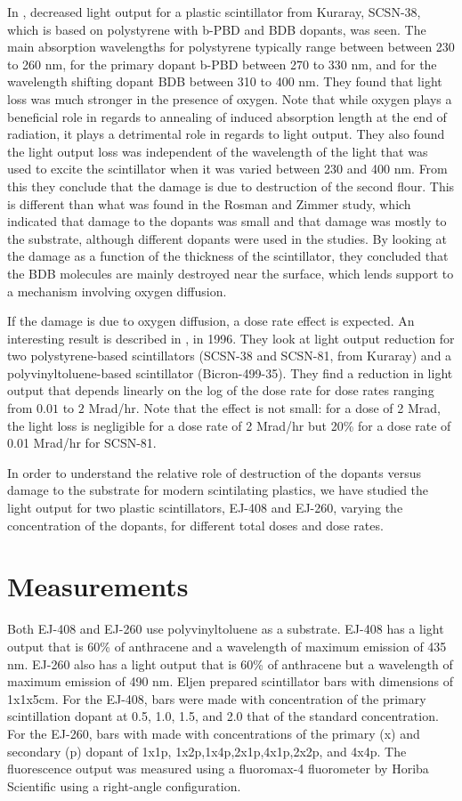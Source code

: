 \documentclass[review]{elsarticle}
\begin{document}
In \cite{Wick1991472}, decreased light
output for a plastic scintillator from Kuraray, SCSN-38, which
is based on polystyrene with b-PBD and BDB dopants, was seen.
The main absorption wavelengths for polystyrene typically range between
between 230 to 260 nm, for the primary dopant b-PBD between 270 to 330 nm,
and for the wavelength shifting dopant BDB between 310 to 400 nm.
They found that light loss was much stronger in the presence of oxygen.
Note that while oxygen plays a beneficial role in regards
to annealing of induced absorption length at the end of radiation, 
it plays a detrimental role in 
regards to light output.  
They also found the light output loss
was independent of the wavelength of the light
that was used to excite the scintillator when it
was varied between 230 and 400 nm.
From this they conclude that the damage is due to destruction
of the second flour.  This is different than what was found in
the Rosman and Zimmer study, which indicated that damage to the dopants was
small and that damage was mostly to the substrate,
although different dopants were used in the studies.
By looking at the damage as a function of the thickness of the scintillator,
they concluded that the BDB molecules are mainly destroyed
near the surface, which lends support to a mechanism involving
oxygen diffusion.

If the damage is due to oxygen diffusion, a dose rate effect
is expected.
An interesting result is described in \cite{Biagtan1996125}, in 1996.  They look at light output reduction for two
polystyrene-based scintillators (SCSN-38 and SCSN-81, from Kuraray) and a
polyvinyltoluene-based scintillator (Bicron-499-35).  
They find a reduction in light output that depends linearly on the
log of the dose rate for dose rates ranging from $0.01$ to
$2$ Mrad/hr.  Note that the effect is not small: for a
dose of 2 Mrad, the light loss is negligible for a dose rate
of 2 Mrad/hr but 20\% for a dose rate of 0.01 Mrad/hr for SCSN-81.

In order to understand the relative role of destruction of the dopants versus damage to the substrate for modern scintilating plastics,
we have studied the light output for two plastic scintillators, EJ-408 and EJ-260, varying the concentration of the dopants, for
different total doses and dose rates.  




\section{Measurements}
Both EJ-408 and EJ-260 use polyvinyltoluene as a substrate.  EJ-408 has a light output that is 60\% of anthracene and a wavelength of maximum emission of 435 nm.  
EJ-260 also has a light output that is 60\% of anthracene but a wavelength of maximum emission of 490 nm.  Eljen prepared scintillator bars
with dimensions of 1x1x5cm.  For the EJ-408, bars were made with concentration of the primary scintillation dopant at 0.5, 1.0, 1.5, and 2.0 that of
the standard concentration.  For the EJ-260, bars with made with concentrations of the primary (x) and secondary (p) dopant of 1x1p, 1x2p,1x4p,2x1p,4x1p,2x2p, and 4x4p.
The fluorescence output was measured using a fluoromax-4 fluorometer by Horiba Scientific using a right-angle configuration.  
\end{document}
